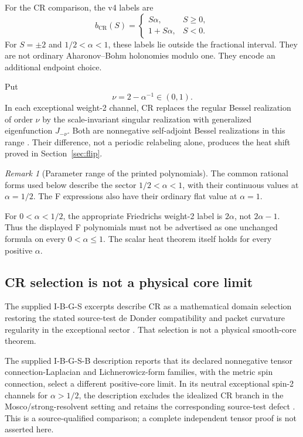 \documentclass[11pt,a4paper]{article}
\newcommand{\CR}{\mathrm{CR}}
\newcommand{\loc}[1]{\nolinkurl{#1}}
\theoremstyle{plain}
\theoremstyle{definition}
\theoremstyle{remark}
\newtheorem{remark}[theorem]{Remark}
\numberwithin{equation}{section}
\begin{document}
For the CR comparison, the v4 labels are
\begin{equation}
b_\CR(S)=
\begin{cases}
S\alpha,&S\ge0,\\
1+S\alpha,&S<0.
\end{cases}
\label{eq:CRlabels}
\end{equation}
For \(S=\pm2\) and \(1/2<\alpha<1\), these labels lie outside
the fractional interval. They are not ordinary Aharonov--Bohm
holonomies modulo one. They encode an additional endpoint choice.

Put
\begin{equation}
\nu=2-\alpha^{-1}\in(0,1).
\label{eq:nu}
\end{equation}
In each exceptional weight-2 channel, CR replaces the regular
Bessel realization of order \(\nu\) by the scale-invariant singular
realization with generalized eigenfunction \(J_{-\nu}\).
Both are nonnegative self-adjoint Bessel realizations in this range
\cite{DerezinskiRichard}.
Their difference, not a periodic relabeling alone, produces the
heat shift proved in Section~\ref{sec:flip}.

\begin{remark}[Parameter range of the printed polynomials]
\label{rem:range}
The common rational forms used below describe the sector
\(1/2<\alpha<1\), with their continuous values at \(\alpha=1/2\).
The F expressions also have their ordinary flat value at \(\alpha=1\).

For \(0<\alpha<1/2\), the appropriate Friedrichs weight-2 label is
\(2\alpha\), not \(2\alpha-1\).
Thus the displayed F polynomials must not be advertised as one
unchanged formula on every \(0<\alpha\le1\).
The scalar heat theorem itself holds for every positive \(\alpha\).
\end{remark}

\subsection{CR selection is not a physical core limit}

The supplied I-B-G-S excerpts describe CR as a mathematical domain
selection restoring the stated source-test de Donder compatibility
and packet curvature regularity in the exceptional sector
\cite[{\loc{def:geo}, \loc{thm:selection},
\loc{thm:spin2}}]{CheungIBGS}.
That selection is not a physical smooth-core theorem.

The supplied I-B-G-S-B description reports that its declared
nonnegative tensor connection-Laplacian and Lichnerowicz-form
families, with the metric spin connection, select a different
positive-core limit. In its neutral exceptional spin-2 channels
for \(\alpha>1/2\), the description excludes the idealized CR
branch in the Mosco/strong-resolvent setting and retains the
corresponding source-test defect
\cite[{\loc{cor:exclude}, \loc{thm:contrast},
\loc{prop:warddefect}}]{CheungTensor}.
This is a source-qualified comparison; a complete independent
tensor proof is not asserted here.
\end{document}
